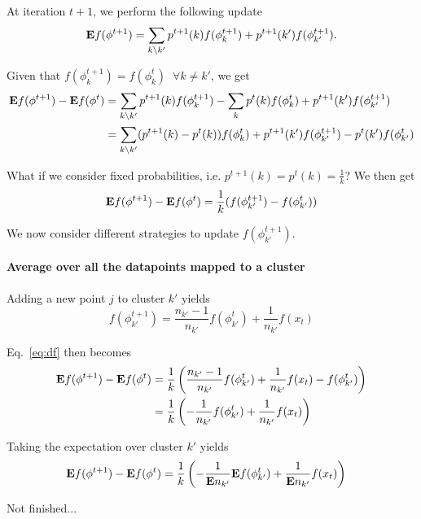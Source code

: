 \documentclass{article}
\newcommand{\E}{{\bf E}}
\begin{document}
At iteration $t+1$, we perform the following update
\begin{align}
\E f(\phi^{t+1}) = \sum_{k \backslash k'} p^{t+1}(k) f(\phi^{t+1}_k) + p^{t+1}(k') f(\phi^{t+1}_{k'}).
\end{align}

Given that $f(\phi^{t+1}_k) = f(\phi^{t}_k) \;\; \forall k \neq k'$, we get
\begin{align}
\E f(\phi^{t+1}) - \E f(\phi^t) &= \sum_{k \backslash k'} p^{t+1}(k) f(\phi^{t+1}_k) - \sum_k p^t(k) f(\phi^t_k) + p^{t+1}(k') f(\phi^{t+1}_{k'}) \nonumber \\
&= \sum_{k \backslash k'} (p^{t+1}(k) - p^t(k)) f(\phi^{t}_k) + p^{t+1}(k') f(\phi^{t+1}_{k'}) - p^t(k') f(\phi^t_{k'})
\end{align}

What if we consider fixed probabilities, i.e. $p^{t+1}(k) = p^t(k) = \frac{1}{k}$? We then get
\begin{equation}
\E f(\phi^{t+1}) - \E f(\phi^t) = \frac{1}{k} ( f(\phi^{t+1}_{k'}) - f(\phi^t_{k'}))
\label{eq:df}
\end{equation}

We now consider different strategies to update $f(\phi^{t+1}_{k'})$.

\paragraph{Average over all the datapoints mapped to a cluster}
Adding a new point $j$ to cluster $k'$ yields
$$
f(\phi^{t+1}_{k'}) = \frac{n_{k'}-1}{n_{k'}} f(\phi^t_{k'}) + \frac{1}{n_{k'}} f(x_t)
$$

Eq.~\ref{eq:df} then becomes
\begin{align}
\E f(\phi^{t+1}) - \E f(\phi^t) &= \frac{1}{k} \left( \frac{n_{k'}-1}{n_{k'}} f(\phi^t_{k'}) + \frac{1}{n_{k'}} f(x_t) - f(\phi^t_{k'}) \right) \nonumber \\
&= \frac{1}{k} \left( -\frac{1}{n_{k'}} f(\phi^t_{k'}) + \frac{1}{n_{k'}} f(x_t) \right)
\end{align}

Taking the expectation over cluster $k'$ yields
\begin{align}
\E f(\phi^{t+1}) - \E f(\phi^t)
&= \frac{1}{k} \left( -\frac{1}{\E n_{k'}} \E f(\phi^t_{k'}) + \frac{1}{\E n_{k'}} f(x_t) \right)
\end{align}

\vspace{5cm}
Not finished...
\end{document}
